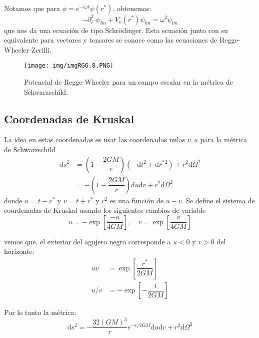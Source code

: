 \documentclass[../main]{subfiles}
\begin{document}
\begin{adjustwidth}{0pt}{-100pt}
Notamos que para $\phi=e^{-i\omega t}\psi(r^*)$, obtenemos:
\begin{equation}
    -\partial^2_{r^*}\psi_{lm}+V_e(r^*)\psi_{lm}=\omega^2 \psi_{lm}
\end{equation}
que nos da una ecuación de tipo Schrödinger. Esta ecuación junto con su equivalente para vectores y tensores se conoce como las ecuaciones de Regge-Wheeler-Zerilli.
\begin{figure}[H]
    \begin{adjustwidth}{0pt}{-100pt}
    \centering
    \texttt{[image: img/imgRG6.8.PNG]}
    \caption{Potencial de Regge-Wheeler para un campo escalar en la métrica de Schwarzschild.}
    \end{adjustwidth}
\end{figure}

\subsection{Coordenadas de Kruskal}

La idea en estas coordenadas es usar las coordenadas nulas $v, u$ para la métrica de Schwarzschild
\begin{equation}
    \begin{split}
        \mathrm{d}s^2&=\left(1-\dfrac{2GM}{r}\right)(-\mathrm{d}t^2+\mathrm{d}r^*{}^2)+r^2\mathrm{d}\Omega^2\\
        &=-\left(1-\dfrac{2GM}{r}\right)\mathrm{d}u\mathrm{d}v+r^2\mathrm{d}\Omega^2
    \end{split}
\end{equation}
donde $u=t-r^*$ y $v=t+r^*$ y $r^2$ es una función de $u-v$. Se define el sistema de coordenadas de Kruskal usando los siguientes cambios de variable
\begin{equation}
    u=-\exp\left[\dfrac{-u}{4GM}\right],\quad v=\exp\left[\dfrac{v}{4GM}\right]
\end{equation}

vemos que, el exterior del agujero negro corresponde a $u<0$ y $v>0$ del horizonte:
\begin{equation}
    \begin{split}
        uv&=\exp\left[\dfrac{r^*}{2GM}\right]\\
        u/v&=-\exp\left[-\dfrac{t}{2GM}\right]
    \end{split}
\end{equation}

Por lo tanto la métrica:
\begin{equation}
    \mathrm{d}s^2=-\dfrac{32(GM)^3}{r}e^{-r/2GM}\mathrm{d}u\mathrm{d}v+r^2\mathrm{d}\Omega^2
\end{equation}


\end{adjustwidth}
\end{document}
